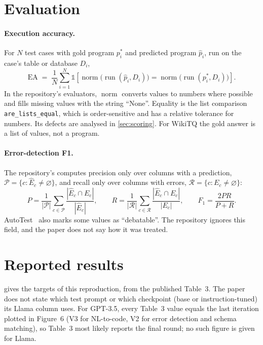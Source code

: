 \section{Evaluation}\label{sec:paper-metrics}

\paragraph{Execution accuracy.} For $N$ test cases with gold program $p_i^\ast$ and predicted program $\hat p_i$, run
on the case's table or database $D_i$,
\begin{equation}
  \mathrm{EA} \;=\; \frac{1}{N}\sum_{i=1}^{N} \mathbb{1}\!\left[\operatorname{norm}\bigl(\operatorname{run}(\hat
  p_i,D_i)\bigr) = \operatorname{norm}\bigl(\operatorname{run}(p_i^\ast,D_i)\bigr)\right].
  \label{eq:ea}
\end{equation}
In the repository's evaluators, $\operatorname{norm}$ converts values to numbers where possible and fills missing values
with the string ``None''. Equality is the list comparison \texttt{are\_lists\_equal}, which is order-sensitive and has a
relative tolerance for numbers. Its defects are analysed in \cref{sec:scoring}. For WikiTQ the gold answer is a list of
values, not a program.

\paragraph{Error-detection F1.} The repository's  computes precision only over columns with a
prediction, $\mathcal{P}=\{c:\hat E_c\neq\varnothing\}$, and recall only over columns with errors,
$\mathcal{R}=\{c:E_c\neq\varnothing\}$:
\begin{equation}
  P=\frac{1}{|\mathcal{P}|}\sum_{c\in\mathcal{P}}\frac{|\hat E_c\cap E_c|}{|\hat E_c|},\qquad
  R=\frac{1}{|\mathcal{R}|}\sum_{c\in\mathcal{R}}\frac{|\hat E_c\cap E_c|}{|E_c|},\qquad
  F_1=\frac{2PR}{P+R}.
  \label{eq:edf1}
\end{equation}
AutoTest~\cite{autotestrepo} also marks some values as ``debatable''. The repository ignores this field, and the paper
does not say how it was treated.

\section{Reported results}\label{sec:paper-results}

 gives the targets of this reproduction, from the published Table~3. The paper does not state
which test prompt or which checkpoint (base or instruction-tuned) its Llama column uses. For GPT-3.5, every Table~3 value
equals the last iteration plotted in Figure~6 (V3 for NL-to-code, V2 for error detection and schema matching), so Table~3
most likely reports the final round; no such figure is given for Llama.

